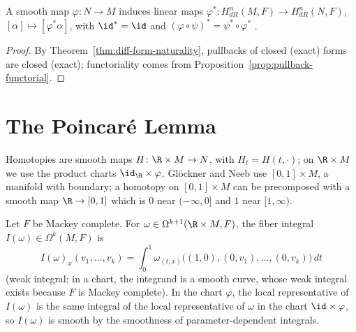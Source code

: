 \begin{proposition}[Functoriality]
  \label{prop:de-rham-functorial}
  \leanok
  A smooth map $\varphi \colon N \to M$ induces linear maps $\varphi^* \colon H^n_{dR}(M, F)
  \to H^n_{dR}(N, F)$, $[\alpha] \mapsto [\varphi^*\alpha]$, with $\id^* = \id$ and
  $(\varphi \circ \psi)^* = \psi^* \circ \varphi^*$ \cite[Section~3.6]{GN26}.
\end{proposition}

\begin{proof}
  \leanok
  By Theorem~\ref{thm:diff-form-naturality}, pullbacks of closed (exact) forms are closed
  (exact); functoriality comes from Proposition~\ref{prop:pullback-functorial}.
\end{proof}

\section{The Poincaré Lemma}

Homotopies are smooth maps $H \colon \R \times M \to N$, with $H_t = H(t, \cdot)$; on $\R \times M$
we use the product charts $\id_{\R} \times \varphi$. Glöckner and Neeb use $[0, 1] \times M$, a
manifold with boundary; a homotopy on $[0, 1] \times M$ can be precomposed with a smooth map
$\R \to [0, 1]$ which is $0$ near $(-\infty, 0]$ and $1$ near $[1, \infty)$.

\begin{definition}
  \label{def:fiber-integral}
  \leanok
  Let $F$ be Mackey complete. For $\omega \in \Omega^{k+1}(\R \times M, F)$, the fiber integral
  $I(\omega) \in \Omega^k(M, F)$ is
  \[
    I(\omega)_x(v_1, \dots, v_k) = \int_0^1 \omega_{(t, x)}\bigl((1, 0), (0, v_1), \dots,
    (0, v_k)\bigr)\, dt
  \]
  (weak integral; in a chart, the integrand is a smooth curve, whose weak integral exists because
  $F$ is Mackey complete). In the chart $\varphi$, the local representative of $I(\omega)$ is the
  same integral of the local representative of $\omega$ in the chart $\id \times \varphi$, so
  $I(\omega)$ is smooth by the smoothness of parameter-dependent integrals.
\end{definition}

